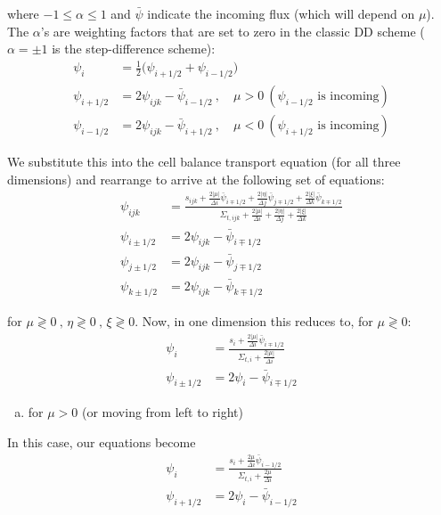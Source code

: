 \documentclass[10pt]{article}
\begin{document}
where $-1 \leq \alpha \leq 1$ and $\bar{\psi}$ indicate the incoming flux (which will depend on $\mu$). The $\alpha$'s are weighting factors that are set to zero in the classic DD scheme ($\alpha = \pm 1$ is the step-difference scheme):
%
\begin{align*}
\psi_{i} &= \frac{1}{2}\bigl(\psi_{i+1/2}+\psi_{i-1/2}\bigr)\\
\psi_{i+1/2} &= 2\psi_{ijk} - \bar{\psi}_{i-1/2}\:,\quad \mu>0\:(\psi_{i-1/2}\text{ is incoming})\\
\psi_{i-1/2} &= 2\psi_{ijk} - \bar{\psi}_{i+1/2}\:,\quad \mu<0 \:(\psi_{i+1/2}\text{ is incoming})
\end{align*}

We substitute this into the cell balance transport equation (for all three dimensions) and rearrange to arrive at the following set of equations:
%
\begin{align*}
    \psi_{ijk} &= \frac{s_{ijk} +
      \frac{2|\mu|}{\Delta i}\bar{\psi}_{i\mp1/2} +
      \frac{2|\eta|}{\Delta j}\bar{\psi}_{j\mp1/2} +
      \frac{2|\xi|}{\Delta k}\bar{\psi}_{k\mp1/2}}{
      \Sigma_{t,ijk} + \frac{2|\mu|}{\Delta i} +
      \frac{2|\eta|}{\Delta j} +
      \frac{2|\xi|}{\Delta k} }\\
    \psi_{i\pm1/2} &= 2\psi_{ijk} - \bar{\psi}_{i\mp1/2}\\
    \psi_{j\pm1/2} &= 2\psi_{ijk} - \bar{\psi}_{j\mp1/2}\\
    \psi_{k\pm1/2} &= 2\psi_{ijk} - \bar{\psi}_{k\mp1/2}
\end{align*}

for $\mu\gtrless0\:,\,\eta\gtrless0\:,\,\xi\gtrless0$. Now, in one dimension this reduces to, for $\mu\gtrless0$:
%
\begin{align*}
    \psi_{i} &= \frac{s_{i} + \frac{2|\mu|}{\Delta i}\bar{\psi}_{i\mp1/2}}{\Sigma_{t,i} + \frac{2|\mu|}{\Delta i}} \\
    \psi_{i\pm1/2} &= 2\psi_{i} - \bar{\psi}_{i\mp1/2}
\end{align*}

%
%
%

\vspace{10pt}
\begin{enumerate}[(a)]
\item for $\mu > 0$ (or moving from left to right)
\end{enumerate}

In this case, our equations become
%
\begin{align*}
\psi_{i} &= \frac{s_{i} + \frac{2\mu}{\Delta i}\bar{\psi}_{i-1/2}}{\Sigma_{t,i} + \frac{2\mu}{\Delta i}} \\
\psi_{i +1/2} &= 2\psi_{i} - \bar{\psi}_{i - 1/2}
\end{align*}
\end{document}
